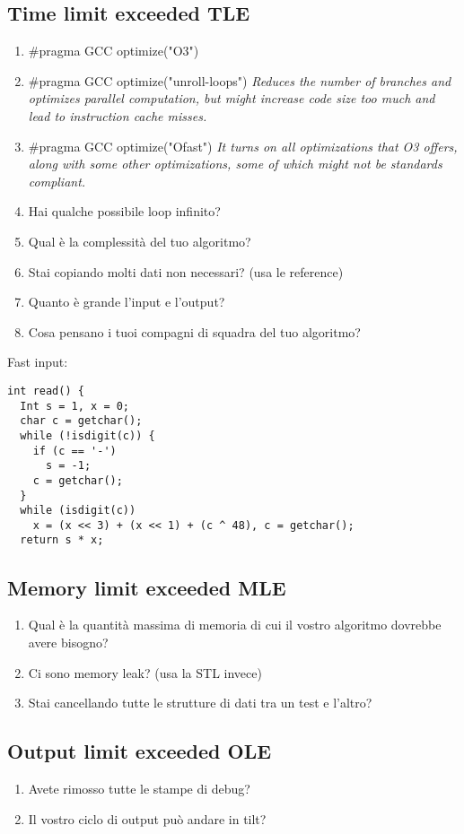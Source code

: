 \subsection{Time limit exceeded TLE}
\begin{enumerate}
    \item $\#$pragma GCC optimize("O3")
    \item $\#$pragma GCC optimize("unroll-loops") \textit{Reduces the number of branches and optimizes parallel computation, but might increase code size too much and lead to instruction cache misses.}
    \item $\#$pragma GCC optimize("Ofast") \textit{It turns on all optimizations that O3 offers, along with some other optimizations, some of which might not be standards compliant.}
    \item Hai qualche possibile loop infinito?
    \item Qual è la complessità del tuo algoritmo?
    \item Stai copiando molti dati non necessari? (usa le reference)
    \item Quanto è grande l'input e l'output?
    \item Cosa pensano i tuoi compagni di squadra del tuo algoritmo?
\end{enumerate}
Fast input:
\begin{lstlisting}
int read() {
  Int s = 1, x = 0;
  char c = getchar();
  while (!isdigit(c)) {
    if (c == '-')
      s = -1;
    c = getchar();
  }
  while (isdigit(c))
    x = (x << 3) + (x << 1) + (c ^ 48), c = getchar();
  return s * x;
\end{lstlisting}

\subsection{Memory limit exceeded MLE}
\begin{enumerate}
    \item Qual è la quantità massima di memoria di cui il vostro algoritmo dovrebbe avere bisogno?
    \item Ci sono memory leak? (usa la STL invece)
    \item Stai cancellando tutte le strutture di dati tra un test e l'altro?
\end{enumerate}

\subsection{Output limit exceeded OLE}
\begin{enumerate}
    \item Avete rimosso tutte le stampe di debug?
    \item Il vostro ciclo di output può andare in tilt?
\end{enumerate}

